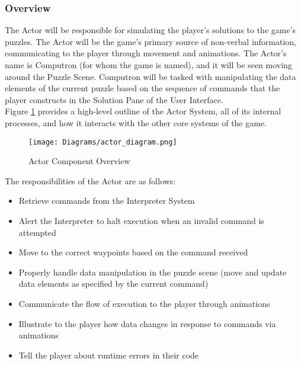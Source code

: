 \subsubsection{Overview}
The Actor will be responsible for simulating the player's solutions to the game's puzzles. The Actor will be the game's primary source of non-verbal information, communicating to the player through movement and animations. The Actor's name is Computron (for whom the game is named), and it will be seen moving around the Puzzle Scene. Computron will be tasked with manipulating the data elements of the current puzzle based on the sequence of commands that the player constructs in the Solution Pane of the User Interface. \\

Figure \ref{fig:actor_diagram} provides a high-level outline of the Actor System, all of its internal processes, and how it interacts with the other core systems of the game.\\

\begin{figure}[!htb]
  \caption{Actor Component Overview}
  \label{fig:actor_diagram}
  \centering
  \texttt{[image: Diagrams/actor\_diagram.png]}
\end{figure}
\newpage
The responsibilities of the Actor are as follows:

\begin{itemize}
	\item Retrieve commands from the Interpreter System
	\item Alert the Interpreter to halt execution when an invalid command is attempted
	\item Move to the correct waypoints based on the command received
	\item Properly handle data manipulation in the puzzle scene (move and update data elements
			as specified by the current command)
	\item Communicate the flow of execution to the player through animations
	\item Illustrate to the player how data changes in response to commands via animations
	\item Tell the player about runtime errors in their code
\end{itemize}

